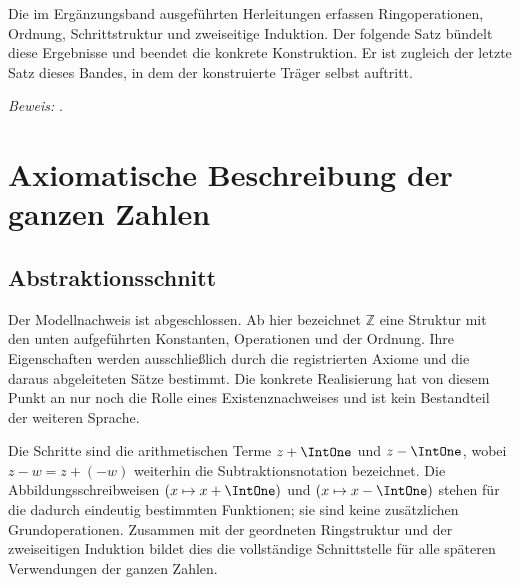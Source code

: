 \documentclass[main.tex]{subfiles}
\begin{document}
Die im Ergänzungsband ausgeführten Herleitungen erfassen Ringoperationen,
Ordnung, Schrittstruktur und zweiseitige Induktion. Der folgende Satz bündelt diese
Ergebnisse und beendet die konkrete Konstruktion. Er ist zugleich der letzte
Satz dieses Bandes, in dem der konstruierte Träger selbst auftritt.

\hypertarget{integers.main}{}
\par\noindent\emph{Beweis:} .\par


\chapter{Axiomatische Beschreibung der ganzen Zahlen}

\section{Abstraktionsschnitt}

Der Modellnachweis ist abgeschlossen. Ab hier bezeichnet \(\mathbb Z\) eine
Struktur mit den unten aufgeführten Konstanten, Operationen und der
Ordnung. Ihre Eigenschaften werden ausschließlich durch die
registrierten Axiome und die daraus abgeleiteten Sätze bestimmt. Die konkrete
Realisierung hat von diesem Punkt an nur noch die Rolle eines
Existenznachweises und ist kein Bestandteil der weiteren Sprache.

Die Schritte sind die arithmetischen Terme \(z+\IntOne\) und
\(z-\IntOne\), wobei \(z-w=z+(-w)\) weiterhin die Subtraktionsnotation
bezeichnet. Die Abbildungsschreibweisen \((x\mapsto x+\IntOne)\) und
\((x\mapsto x-\IntOne)\) stehen für die dadurch eindeutig bestimmten
Funktionen; sie sind keine zusätzlichen Grundoperationen. Zusammen mit der
geordneten Ringstruktur und der zweiseitigen Induktion bildet dies die
vollständige Schnittstelle für alle späteren Verwendungen der ganzen Zahlen.
\end{document}

